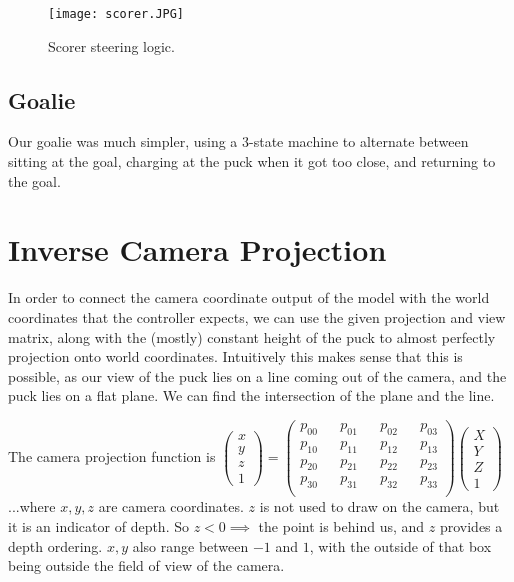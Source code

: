 \documentclass{article}
\begin{document}
\begin{figure}[h!]
    \centering
    \texttt{[image: scorer.JPG]}
    \caption{Scorer steering logic.}
\end{figure}

\subsection{Goalie}
Our goalie was much simpler, using a 3-state machine to alternate between sitting at the goal, charging at the puck when it got too close, and returning to the goal.

\section{Inverse Camera Projection}

In order to connect the camera coordinate output of the model with the world coordinates that the controller expects, we can use the given projection and view matrix, along with the (mostly) constant height of the puck to almost perfectly projection onto world coordinates. Intuitively this makes sense that this is possible, as our view of the puck lies on a line coming out of the camera, and the puck lies on a flat plane. We can find the intersection of the plane and the line.

The camera projection function is 
$\begin{pmatrix} x \\ y \\ z \\ 1\end{pmatrix}
 = 
\begin{pmatrix} p_{00} && p_{01} && p_{02} && p_{03}\\
                p_{10} && p_{11} && p_{12} && p_{13}\\
                p_{20} && p_{21} && p_{22} && p_{23}\\
                p_{30} && p_{31} && p_{32} && p_{33}\\
\end{pmatrix}
\begin{pmatrix} X \\ Y \\ Z \\ 1\end{pmatrix}
$\\
...where $x,y,z$ are camera coordinates. $z$ is not used to draw on the camera, but it is an indicator of depth. So $z < 0 \implies $ the point is behind us, and $z$ provides a depth ordering. $x,y$ also range between $-1$ and $1$, with the outside of that box being outside the field of view of the camera.
\end{document}
